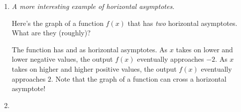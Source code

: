 \documentclass{article}
\begin{document}
\begin{enumerate}[resume]
\begin{enumerate}
  \item
    \begin{problem}[0.5in]
      The other function in \ref{basic-graphs-1-sketch} is increasing on $(0, \infty)$. Does it have an \textbf{upper bound} (a value that it never gets above) on $(0, \infty)$, or does it \textbf{increase without bound} on $(0, \infty)$?
    \end{problem}

    \begin{solution}
      The function $\sqrt{x}$ increases on $[0,\infty)$. As $x$ takes on ever higher positive
      values, the function outputs ever higher positive numbers, therefore the function increases
      without bound.
    \end{solution}

  \end{enumerate}

\item  \label{horizontal-asymptote-misconceptions}


  \emph{A more interesting example of horizontal asymptotes.}

  \begin{problem}
    Here's the graph of a function $f(x)$ that has \emph{two}
    horizontal asymptotes. What are they (roughly)?

  \end{problem}

  \begin{solution}
    The function has  and  as horizontal asymptotes. 
    As $x$ takes on lower and lower
    negative values, the output $f(x)$ eventually approaches $-2$. 
    As $x$ takes on higher and higher positive values, the output $f(x)$ eventually approaches $2$. 
    Note that the graph of a function can cross a horizontal asymptote! 
  \end{solution}
\item 


\end{enumerate}
\end{document}
